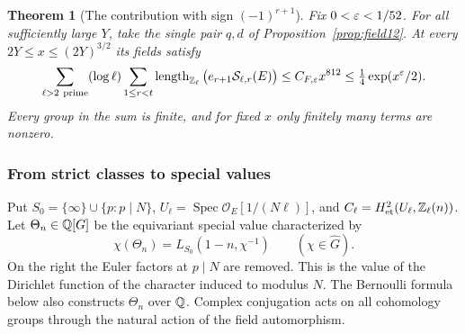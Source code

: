 \documentclass[a4paper,11pt]{article}
\newtheorem{theorem}[proposition]{Theorem}
\theoremstyle{definition}
\theoremstyle{remark}
\newcommand{\ZZ}{\mathbb Z}\newcommand{\ord}{\operatorname{ord}}
\newcommand{\len}{\operatorname{length}}\newcommand{\Res}{\operatorname*{Res}}
\numberwithin{equation}{section}
\begin{document}
\begin{theorem}[The contribution with sign \((-1)^{r+1}\)]\label{thm:critical13}
Fix \(0<\varepsilon<1/52\). For all sufficiently large \(Y\), take the single pair \(q,d\) of Proposition~\ref{prop:field12}. At every \(2Y\le x\le(2Y)^{3/2}\) its fields satisfy
\begin{equation}
 \sum_{\ell>2\ {\rm prime}}(\log\ell)\sum_{1\le r<t}
          \len_{\ZZ_\ell}\big(e_{r+1}\mathcal S_{\ell,r}(E)\big)
       \le C_{F,\eps} x^{812}
       \le \tfrac14\exp(x^\eps/2).
 \label{eq:critical13}
\end{equation}
Every group in the sum is finite, and for fixed \(x\) only finitely many terms are nonzero.
\end{theorem}

\subsubsection{From strict classes to special values}\label{nav:II-01}
Put \(S_0=\{\infty\}\cup\{p:p\mid N\}\), \(U_\ell=\operatorname{Spec}\mathcal O_E[1/(N\ell)]\), and \(C_\ell=H^2_{\rm et}(U_\ell,\ZZ_\ell(n))\). Let \(\Theta_n\in\mathbb Q[G]\) be the equivariant special value characterized by
\[
     \chi(\Theta_n)=L_{S_0}(1-n,\chi^{-1})\qquad(\chi\in\widehat G).
\]
On the right the Euler factors at \(p\mid N\) are removed. This is the value of the Dirichlet function of the character induced to modulus \(N\). The Bernoulli formula below also constructs \(\Theta_n\) over \(\mathbb Q\). Complex conjugation acts on all cohomology groups through the natural action of the field automorphism.
\end{document}

